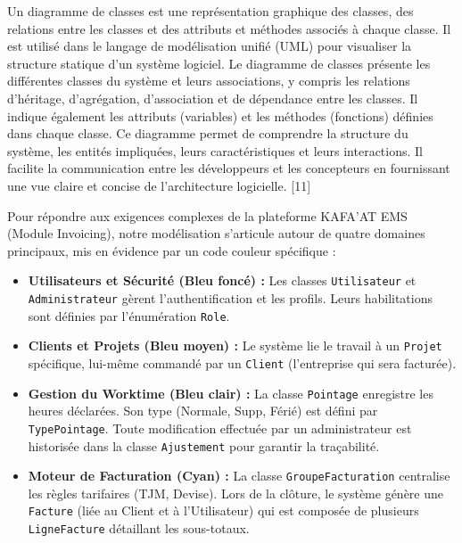 \documentclass[12pt, a4paper, openany]{report}
\begin{document}
\vspace{-0.4cm}
Un diagramme de classes est une représentation graphique des classes, des relations entre les classes et des attributs et méthodes associés à chaque classe. Il est utilisé dans le langage de modélisation unifié (UML) pour visualiser la structure statique d'un système logiciel. Le diagramme de classes présente les différentes classes du système et leurs associations, y compris les relations d'héritage, d'agrégation, d'association et de dépendance entre les classes. Il indique également les attributs (variables) et les méthodes (fonctions) définies dans chaque classe. Ce diagramme permet de comprendre la structure du système, les entités impliquées, leurs caractéristiques et leurs interactions. Il facilite la communication entre les développeurs et les concepteurs en fournissant une vue claire et concise de l'architecture logicielle. [11]

Pour répondre aux exigences complexes de la plateforme KAFA'AT EMS (Module Invoicing), notre modélisation s'articule autour de quatre domaines principaux, mis en évidence par un code couleur spécifique :

\begin{itemize}[label=\textcolor{royalBlue}{\rule{1.2ex}{1.2ex}}, leftmargin=*, itemsep=0.2cm]
    \item \textcolor{primaryBlue}{\textbf{Utilisateurs et Sécurité (Bleu foncé) :}} Les classes \texttt{Utilisateur} et \texttt{Administrateur} gèrent l'authentification et les profils. Leurs habilitations sont définies par l'énumération \texttt{Role}.
    \item \textcolor{primaryBlue}{\textbf{Clients et Projets (Bleu moyen) :}} Le système lie le travail à un \texttt{Projet} spécifique, lui-même commandé par un \texttt{Client} (l'entreprise qui sera facturée).
    \item \textcolor{primaryBlue}{\textbf{Gestion du Worktime (Bleu clair) :}} La classe \texttt{Pointage} enregistre les heures déclarées. Son type (Normale, Supp, Férié) est défini par \texttt{TypePointage}. Toute modification effectuée par un administrateur est historisée dans la classe \texttt{Ajustement} pour garantir la traçabilité.
    \item \textcolor{primaryBlue}{\textbf{Moteur de Facturation (Cyan) :}} La classe \texttt{GroupeFacturation} centralise les règles tarifaires (TJM, Devise). Lors de la clôture, le système génère une \texttt{Facture} (liée au Client et à l'Utilisateur) qui est composée de plusieurs \texttt{LigneFacture} détaillant les sous-totaux.
\end{itemize}
\end{document}
